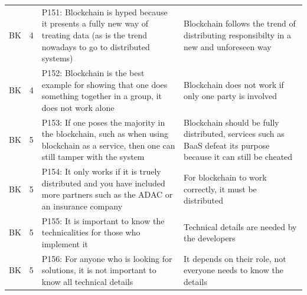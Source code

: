 \begin{table}[H]
\begin{tabularx}{\textwidth}{ll|X|p{4.5cm}}
	BK & 4 & P151: Blockchain is hyped because it presents a fully new way of treating data (as is the trend nowadays to go to distributed systems) & Blockchain follows the trend of distributing responsibilty in a new and unforeseen way \\  
	BK & 4 & P152: Blockchain is the best example for showing that one does something together in a group, it does not work alone & Blockchain does not work if only one party is involved \\  
	BK & 5 & P153: If one poses the majority in the blockchain, such as when using blockchain as a service, then one can still tamper with the system & Blockchain should be fully distributed, services such as BaaS defeat its purpose because it can still be cheated \\  
	BK & 5 & P154: It only works if it is truely distributed and you have included more partners such as the ADAC or an insurance company & For blockchain to work correctly, it must be distributed \\ 
	BK & 5 & P155: It is important to know the technicalities for those who implement it & Technical details are needed by the developers \\
	BK & 5 & P156: For anyone who is looking for solutions, it is not important to know all technical details & It depends on their role, not everyone needs to know the details \\  
\end{tabularx}
\end{table}

